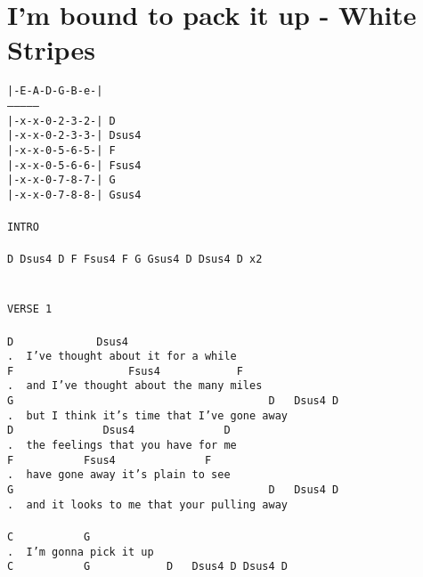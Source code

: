 \newpage
\section{I'm bound to pack it up - White Stripes}
\label{I'm bound to pack it up - White Stripes}
\texttt{|-E-A-D-G-B-e-|\\
---------------\\
|-x-x-0-2-3-2-|\ D\\
|-x-x-0-2-3-3-|\ Dsus4\\
|-x-x-0-5-6-5-|\ F\\
|-x-x-0-5-6-6-|\ Fsus4\\
|-x-x-0-7-8-7-|\ G\\
|-x-x-0-7-8-8-|\ Gsus4\\
\\
INTRO\\
\\
D\ Dsus4\ D\ F\ Fsus4\ F\ G\ Gsus4\ D\ Dsus4\ D\ x2\\
\\
\\
VERSE\ 1\\
\\
D\ \ \ \ \ \ \ \ \ \ \ \ \ Dsus4\ \ \ \ \ \\
. \ I've\ thought\ about\ it\ for\ a\ while\\
F\ \ \ \ \ \ \ \ \ \ \ \ \ \ \ \ \ \ Fsus4\ \ \ \ \ \ \ \ \ \ \ \ F\\
. \ and\ I've\ thought\ about\ the\ many\ miles\\
G\ \ \ \ \ \ \ \ \ \ \ \ \ \ \ \ \ \ \ \ \ \ \ \ \ \ \ \ \ \ \ \ \ \ \ \ \ \ \ \ D\ \ \ Dsus4\ D\\
. \ but\ I\ think\ it's\ time\ that\ I've\ gone\ away\\
D\ \ \ \ \ \ \ \ \ \ \ \ \ \ Dsus4\ \ \ \ \ \ \ \ \ \ \ \ \ \ D\\
. \ the\ feelings\ that\ you\ have\ for\ me\\
F\ \ \ \ \ \ \ \ \ \ \ Fsus4\ \ \ \ \ \ \ \ \ \ \ \ \ \ F\\
. \ have\ gone\ away\ it's\ plain\ to\ see\\
G\ \ \ \ \ \ \ \ \ \ \ \ \ \ \ \ \ \ \ \ \ \ \ \ \ \ \ \ \ \ \ \ \ \ \ \ \ \ \ \ D\ \ \ Dsus4\ D\\
. \ and\ it\ looks\ to\ me\ that\ your\ pulling\ away\\
\\
C\ \ \ \ \ \ \ \ \ \ \ G\\
. \ I'm\ gonna\ pick\ it\ up\\
C\ \ \ \ \ \ \ \ \ \ \ G\ \ \ \ \ \ \ \ \ \ \ \ D\ \ \ Dsus4\ D\ Dsus4\ D\\
}
